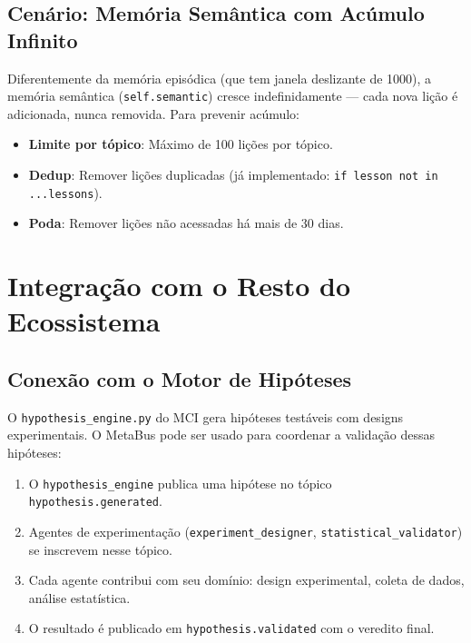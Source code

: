 \subsection{Cenário: Memória Semântica com Acúmulo Infinito}

Diferentemente da memória episódica (que tem janela deslizante de 1000), a memória semântica (\texttt{self.semantic}) cresce indefinidamente — cada nova lição é adicionada, nunca removida. Para prevenir acúmulo:

\begin{itemize}
    \item \textbf{Limite por tópico}: Máximo de 100 lições por tópico.
    \item \textbf{Dedup}: Remover lições duplicadas (já implementado: \texttt{if lesson not in ...lessons}).
    \item \textbf{Poda}: Remover lições não acessadas há mais de 30 dias.
\end{itemize}

\section{Integração com o Resto do Ecossistema}
\label{sec:ecosystem-integration}

\subsection{Conexão com o Motor de Hipóteses}

O \texttt{hypothesis\_engine.py} do MCI gera hipóteses testáveis com designs experimentais. O MetaBus pode ser usado para coordenar a validação dessas hipóteses:

\begin{enumerate}
    \item O \texttt{hypothesis\_engine} publica uma hipótese no tópico \texttt{hypothesis.generated}.
    \item Agentes de experimentação (\texttt{experiment\_designer}, \texttt{statistical\_validator}) se inscrevem nesse tópico.
    \item Cada agente contribui com seu domínio: design experimental, coleta de dados, análise estatística.
    \item O resultado é publicado em \texttt{hypothesis.validated} com o veredito final.
\end{enumerate}

